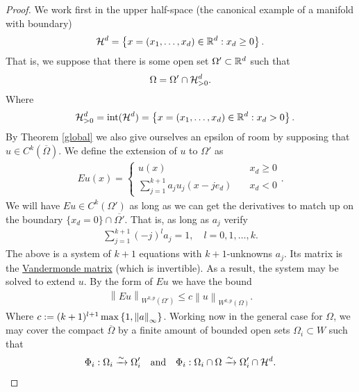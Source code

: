\documentclass[12pt]{article}
\theoremstyle{remark}
\renewcommand{\norm}[1]{\left\lVert #1 \right\rVert}\renewcommand{\abs}[1]{\left| #1 \right|}
\begin{document}
\begin{proof}
	We work first in the upper half-space (the canonical example of a manifold with boundary)
	\begin{align*}
		\mathcal{H}^d =\left\{x=(x_1,\ldots,x_d) \in \mathbb{R}^d : x_d \geq 0\right\} .
	\end{align*}
	That is, we suppose that there is some open set $\Omega' \subset  \mathbb{R}^d$ such that
	\begin{align*}
		\Omega=\Omega' \cap \mathcal{H}^d_{>0}.
	\end{align*}
	Where
	\begin{align*}
		\quad \mathcal{H}^d_{>0} =\mathrm{int}(\mathcal{H}^d)=\left\{x=(x_1,\ldots,x_d) \in \mathbb{R}^d : x_d >0\right\} .
	\end{align*}
	By Theorem \ref{global} we also give ourselves an epsilon of room by supposing that $u \in C^k(\overline{\Omega})$. We define the extension of $u$ to $\Omega'$ as
	\begin{align*}
		Eu(x) = \begin{cases}
			        u(x) \quad                                 & x_{d}                                 \geq 0      \\
			        \sum_{j=1}^{k+1} a_j  u_j(x - j e_d) \quad & x_d                                           < 0
		        \end{cases}.
	\end{align*}
	We will have $Eu \in C^k(\Omega')$ as long as we can get the derivatives to match up on the boundary $\{x_d=0\}\cap \overline{\Omega'}$. That is,  as long as $a_j$ verify
	\begin{align*}
		\sum_{j=1}^{k+1}(-j)^l a_j =1 , \quad l=0,1,\ldots,k .
	\end{align*}
	The above is a system of $k+1$ equations with $k+1$-unknowns $a_j$. Its matrix is the \href{https://en.wikipedia.org/wiki/Vandermonde_matrix}{Vandermonde matrix} (which is invertible). As a result, the system may be solved to extend $u$. By the form of $Eu$ we have the bound
	\begin{align*}
		\norm{Eu}_{W^{k,p}(\Omega')} \leq c\norm{u}_{W^{k,p}(\Omega)} .
	\end{align*}
	Where $c:= (k+1)^{l+1}\max \set{1,\norm{a}_\infty}$. Working now in the general case for $\Omega$, we may cover the compact $\overline{\Omega}$ by a finite amount of bounded open sets $\Omega_i \subset W$ such that
	\begin{align*}
		\Phi_i : \Omega_i \xrightarrow{\sim} \Omega_i'\quad \text{and}  \quad \Phi_i : \Omega_i \cap \Omega \xrightarrow{\sim} \Omega_i' \cap \Hh^d .

\end{align*}
\end{proof}
\end{document}
